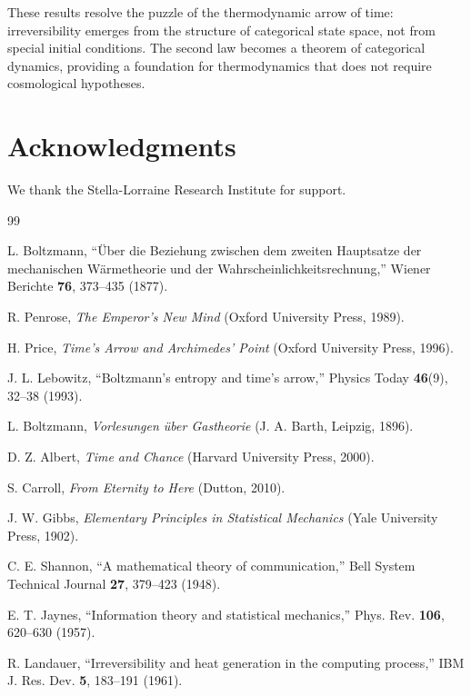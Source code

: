 These results resolve the puzzle of the thermodynamic arrow of time: irreversibility emerges from the structure of categorical state space, not from special initial conditions. The second law becomes a theorem of categorical dynamics, providing a foundation for thermodynamics that does not require cosmological hypotheses.

\section*{Acknowledgments}

We thank the Stella-Lorraine Research Institute for support.

\begin{thebibliography}{99}

 L. Boltzmann, ``\"{U}ber die Beziehung zwischen dem zweiten Hauptsatze der mechanischen W\"{a}rmetheorie und der Wahrscheinlichkeitsrechnung,'' Wiener Berichte \textbf{76}, 373--435 (1877).

 R. Penrose, \textit{The Emperor's New Mind} (Oxford University Press, 1989).

 H. Price, \textit{Time's Arrow and Archimedes' Point} (Oxford University Press, 1996).

 J. L. Lebowitz, ``Boltzmann's entropy and time's arrow,'' Physics Today \textbf{46}(9), 32--38 (1993).

 L. Boltzmann, \textit{Vorlesungen \"{u}ber Gastheorie} (J. A. Barth, Leipzig, 1896).

 D. Z. Albert, \textit{Time and Chance} (Harvard University Press, 2000).

 S. Carroll, \textit{From Eternity to Here} (Dutton, 2010).

 J. W. Gibbs, \textit{Elementary Principles in Statistical Mechanics} (Yale University Press, 1902).

 C. E. Shannon, ``A mathematical theory of communication,'' Bell System Technical Journal \textbf{27}, 379--423 (1948).

 E. T. Jaynes, ``Information theory and statistical mechanics,'' Phys. Rev. \textbf{106}, 620--630 (1957).

 R. Landauer, ``Irreversibility and heat generation in the computing process,'' IBM J. Res. Dev. \textbf{5}, 183--191 (1961).


\end{thebibliography}
